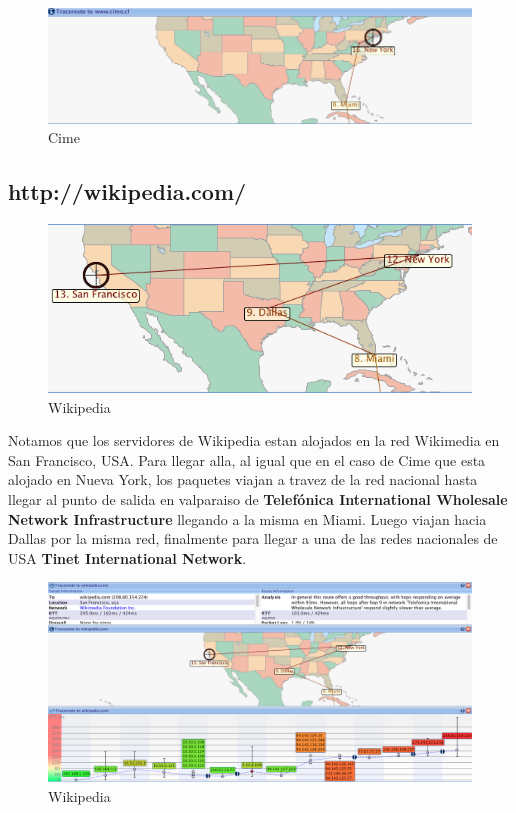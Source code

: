 \documentclass[a4papaer]{article}
\begin{document}
\begin{figure}[h]
  \centering
    \includegraphics[width=1\textwidth]{ss3}
  \caption{Cime}
  \label{fig:Trace Route de http://cime.cl/}
\end{figure}


\pagebreak

\subsection{http://wikipedia.com/}

\begin{figure}[h]
  \centering
    \includegraphics[width=1\textwidth]{ss5}
  \caption{Wikipedia}
  \label{fig:Trace Route de http://wikipedia.org/}
\end{figure}

Notamos que los servidores de Wikipedia estan alojados en la red Wikimedia en San Francisco, USA. Para llegar alla, al igual que en el caso de Cime que esta alojado en Nueva York, los paquetes viajan a travez de la red nacional hasta llegar al punto de salida en valparaiso de \textbf{Telefónica International Wholesale Network Infrastructure} llegando a la misma en Miami. Luego viajan hacia Dallas por la misma red, finalmente para llegar a una de las redes nacionales de USA \textbf{Tinet International Network}. 

\begin{figure}[h]
  \centering
    \includegraphics[width=1\textwidth]{ss4}
  \caption{Wikipedia}
  \label{fig:Trace Route de http://wikipedia.org/}
\end{figure}
\end{document}
